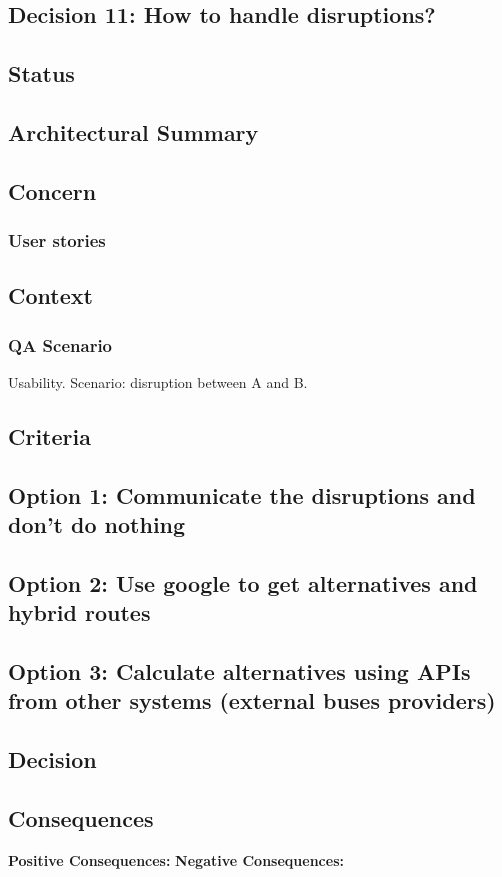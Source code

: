 \subsection{Decision 11: How to handle disruptions?}

\subsection*{Status}

\subsection*{Architectural Summary}


\subsection*{Concern}
\subsubsection*{User stories}

\subsection*{Context}

\subsubsection*{QA Scenario} %
Usability.
Scenario: disruption between A and B.
\subsection*{Criteria}

\subsection*{Option 1: Communicate the disruptions and don't do nothing}
\subsection*{Option 2: Use google to get alternatives and hybrid routes}
\subsection*{Option 3: Calculate alternatives using APIs from other systems (external buses providers)}


\subsection*{Decision}

\subsection*{Consequences}
\textbf{Positive Consequences:}
\textbf{Negative Consequences:}

